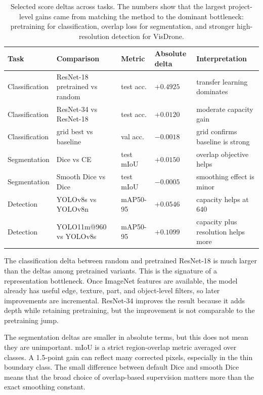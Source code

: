 \documentclass[10pt,twocolumn]{article}
\begin{document}
\begin{table}[!htbp]
\centering
\caption{Selected score deltas across tasks. The numbers show that the largest project-level gains came from matching the method to the dominant bottleneck: pretraining for classification, overlap loss for segmentation, and stronger high-resolution detection for VisDrone.}
\label{tab:appendix_delta_analysis}
\begin{tabular}{lllll}
\toprule
Task & Comparison & Metric & Absolute delta & Interpretation\\
\midrule
Classification & ResNet-18 pretrained vs random & test acc. & $+0.4925$ & transfer learning dominates\\
Classification & ResNet-34 vs ResNet-18 & test acc. & $+0.0120$ & moderate capacity gain\\
Classification & grid best vs baseline & val acc. & $-0.0018$ & grid confirms baseline is strong\\
Segmentation & Dice vs CE & test mIoU & $+0.0150$ & overlap objective helps\\
Segmentation & Smooth Dice vs Dice & test mIoU & $-0.0005$ & smoothing effect is minor\\
Detection & YOLOv8s vs YOLOv8n & mAP50-95 & $+0.0546$ & capacity helps at 640\\
Detection & YOLO11m@960 vs YOLOv8s & mAP50-95 & $+0.1099$ & capacity plus resolution helps more\\
\bottomrule
\end{tabular}
\end{table}

The classification delta between random and pretrained ResNet-18 is much larger than the deltas among pretrained variants. This is the signature of a representation bottleneck. Once ImageNet features are available, the model already has useful edge, texture, part, and object-level filters, so later improvements are incremental. ResNet-34 improves the result because it adds depth while retaining pretraining, but the improvement is not comparable to the pretraining jump.

The segmentation deltas are smaller in absolute terms, but this does not mean they are unimportant. mIoU is a strict region-overlap metric averaged over classes. A 1.5-point gain can reflect many corrected pixels, especially in the thin boundary class. The small difference between default Dice and smooth Dice means that the broad choice of overlap-based supervision matters more than the exact smoothing constant.
\end{document}
